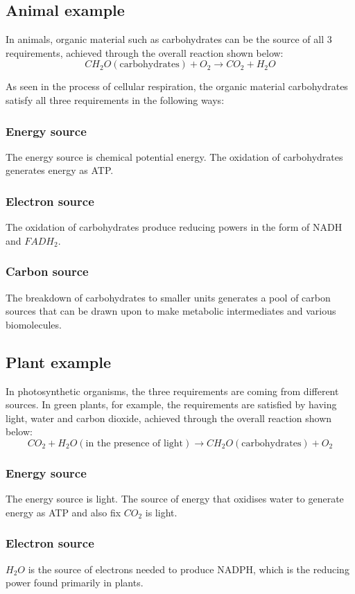 \documentclass[11pt]{article}
\begin{document}
\subsection{Animal example}
\label{sec:orgbdf7394}
In animals, organic material such as carbohydrates can be the source of all 3 requirements, achieved through the overall reaction shown below:
\[CH_2 O (\text{carbohydrates}) + O_2 \rightarrow CO_2 + H_2 O\]

As seen in the process of cellular respiration, the organic material carbohydrates satisfy all three requirements in the following ways:
\subsubsection{Energy source}
\label{sec:org57caba5}
The energy source is chemical potential energy. The oxidation of carbohydrates generates energy as ATP.
\subsubsection{Electron source}
\label{sec:orgc3d128d}
The oxidation of carbohydrates produce reducing powers in the form of NADH and \(FADH_2\).
\subsubsection{Carbon source}
\label{sec:org7e7c2a9}
The breakdown of carbohydrates to smaller units generates a pool of carbon sources that can be drawn upon to make metabolic intermediates and various biomolecules.
\subsection{Plant example}
\label{sec:orge874d85}
In photosynthetic organisms, the three requirements are coming from different sources. In green plants, for example, the requirements are satisfied by having light, water and carbon dioxide, achieved through the overall reaction shown below:
\[CO_2 + H_2 O (\text{in the presence of light}) \rightarrow CH_2 O (\text{carbohydrates}) + O_2\]
\subsubsection{Energy source}
\label{sec:org1cd8aae}
The energy source is light. The source of energy that oxidises water to generate energy as ATP and also fix \(CO_2\) is light.
\subsubsection{Electron source}
\label{sec:org21991ea}
\(H_2 O\) is the source of electrons needed to produce NADPH, which is the reducing power found primarily in plants.
\end{document}
